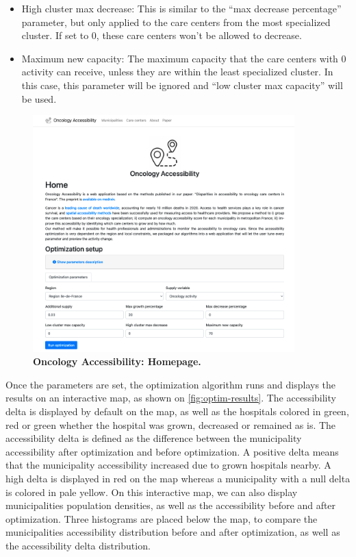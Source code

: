 \begin{itemize}
    \item High cluster max decrease: This is similar to the ``max decrease percentage'' parameter, but only applied to the care centers from the most specialized cluster. If set to 0, these care centers won't be allowed to decrease.
    \item Maximum new capacity: The maximum capacity that the care centers with 0 activity can receive, unless they are within the least specialized cluster. In this case, this parameter will be ignored and ``low cluster max capacity'' will be used.
\end{itemize}

\begin{figure}[H]
    \includegraphics[width=0.9\textwidth]{images/oncology-accessibility/home.png}
    \centering
    \caption{
        \textbf{Oncology Accessibility: Homepage.}
    }
    \label{fig:optim-form}
\end{figure}

Once the parameters are set, the optimization algorithm runs and displays the results on an interactive map, as shown on \cref{fig:optim-results}. The accessibility delta is displayed by default on the map, as well as the hospitals colored in green, red or green whether the hospital was grown, decreased or remained as is. The accessibility delta is defined as the difference between the municipality accessibility after optimization and before optimization. A positive delta means that the municipality accessibility increased due to grown hospitals nearby. A high delta is displayed in red on the map whereas a municipality with a null delta is colored in pale yellow. On this interactive map, we can also display municipalities population densities, as well as the accessibility before and after optimization. Three histograms are placed below the map, to compare the municipalities accessibility distribution before and after optimization, as well as the accessibility delta distribution.

